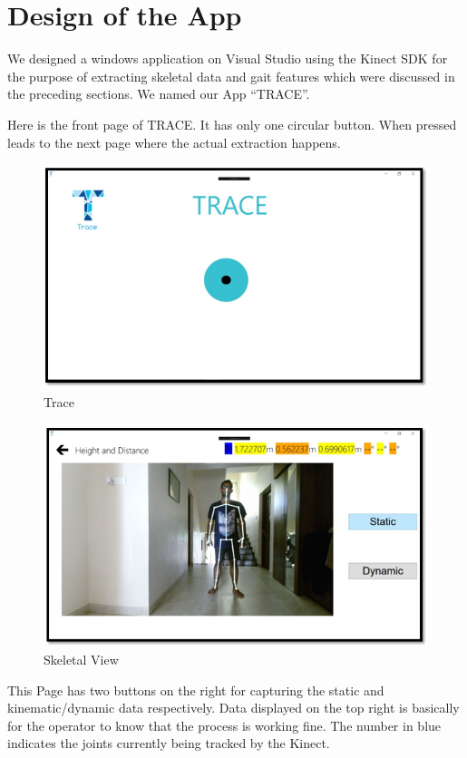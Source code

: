 \clearpage
\section{Design of the App } \label{ Design of the App} 
\noindent We designed a windows application on Visual Studio using the Kinect SDK for the purpose of extracting skeletal data and gait features which were discussed in the preceding sections. We named our App “TRACE”.

\noindent Here is the front page of TRACE. It has only one circular button. When pressed leads to the next page where the actual extraction happens.

\begin{figure}[h]
\centering
\includegraphics[scale=0.8]{trace.png}
\caption{Trace}
\end{figure} 

\begin{figure}[h]
\centering
\includegraphics[scale=0.8]{john.png}
\caption{Skeletal View}
\end{figure}
\newpage
\noindent This Page has two buttons on the right for capturing the static and kinematic/dynamic data respectively. Data displayed on the top right is basically for the operator to know that the process is working fine. The number in blue indicates the joints currently being tracked by the Kinect. 

